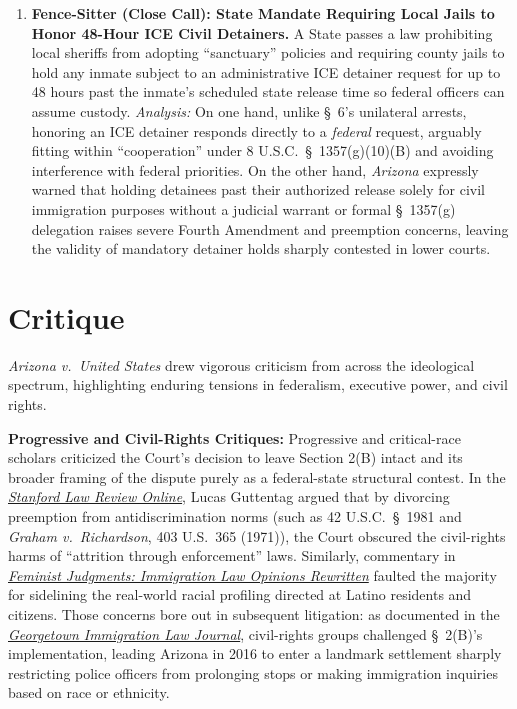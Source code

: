 \documentclass[12pt]{article}
\begin{document}
\begin{enumerate}
\item \textbf{Fence-Sitter (Close Call): State Mandate Requiring Local Jails to Honor 48-Hour ICE Civil Detainers.} A State passes a law prohibiting local sheriffs from adopting ``sanctuary'' policies and requiring county jails to hold any inmate subject to an administrative ICE detainer request for up to 48 hours past the inmate's scheduled state release time so federal officers can assume custody. \textit{Analysis:} On one hand, unlike \S~6's unilateral arrests, honoring an ICE detainer responds directly to a \textit{federal} request, arguably fitting within ``cooperation'' under 8 U.S.C.\ \S~1357(g)(10)(B) and avoiding interference with federal priorities. On the other hand, \textit{Arizona} expressly warned that holding detainees past their authorized release solely for civil immigration purposes without a judicial warrant or formal \S~1357(g) delegation raises severe Fourth Amendment and preemption concerns, leaving the validity of mandatory detainer holds sharply contested in lower courts.
\end{enumerate}

\section{Critique}

\textit{Arizona v.\ United States} drew vigorous criticism from across the ideological spectrum, highlighting enduring tensions in federalism, executive power, and civil rights.

\textbf{Progressive and Civil-Rights Critiques:} Progressive and critical-race scholars criticized the Court's decision to leave Section 2(B) intact and its broader framing of the dispute purely as a federal-state structural contest. In the \href{https://www.stanfordlawreview.org/online/discrimination-preemption-and-arizonas-immigration-law/}{\textit{Stanford Law Review Online}}, Lucas Guttentag argued that by divorcing preemption from antidiscrimination norms (such as 42 U.S.C.\ \S~1981 and \textit{Graham v.\ Richardson}, 403 U.S.\ 365 (1971)), the Court obscured the civil-rights harms of ``attrition through enforcement'' laws. Similarly, commentary in \href{https://www.cambridge.org/core/books/feminist-judgments-immigration-law-opinions-rewritten/commentary-on-arizona-v-united-states-567-us-387-2012/C05E87D040BF471E6BA3D73CFA0BEBE8}{\textit{Feminist Judgments: Immigration Law Opinions Rewritten}} faulted the majority for sidelining the real-world racial profiling directed at Latino residents and citizens. Those concerns bore out in subsequent litigation: as documented in the \href{https://www.law.georgetown.edu/immigration-law-journal/in-print/volume-31-issue-3-spring-2017/arizonas-anti-immigration-law-and-the-pervasiveness-of-racial-profiling/}{\textit{Georgetown Immigration Law Journal}}, civil-rights groups challenged \S~2(B)'s implementation, leading Arizona in 2016 to enter a landmark settlement sharply restricting police officers from prolonging stops or making immigration inquiries based on race or ethnicity.
\end{document}
